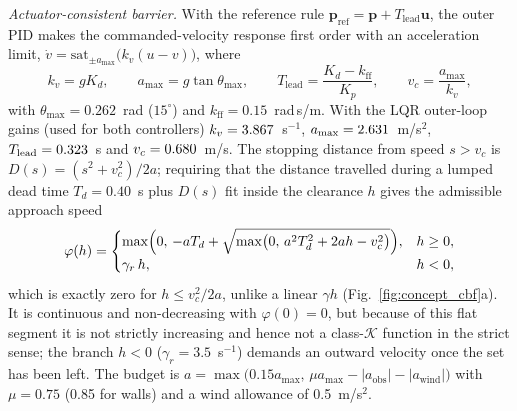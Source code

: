 \documentclass[10pt,letterpaper]{article}
\begin{document}
\emph{Actuator-consistent barrier.} With the reference rule $\mathbf{p}_{\mathrm{ref}}=\mathbf{p}+T_{\mathrm{lead}}\mathbf{u}$, the
outer PID makes the commanded-velocity response first order with an acceleration limit,
$\dot v=\mathrm{sat}_{\pm a_{\max}}\bigl(k_v(u-v)\bigr)$, where
\begin{equation}
    k_v=gK_d,\qquad a_{\max}=g\tan\theta_{\max},\qquad
    T_{\mathrm{lead}}=\frac{K_d-k_{\mathrm{ff}}}{K_p},\qquad v_c=\frac{a_{\max}}{k_v},
    \label{eq:plant}
\end{equation}
with $\theta_{\max}=0.262$~rad ($15^\circ$) and $k_{\mathrm{ff}}=0.15$~rad\,s/m. With the LQR outer-loop gains
(used for both controllers) $k_v=3.867$~s$^{-1}$, $a_{\max}=2.631$~m/s$^2$,
$T_{\mathrm{lead}}=0.323$~s and $v_c=0.680$~m/s. The stopping distance from speed
$s>v_c$ is $D(s)=(s^2+v_c^2)/2a$; requiring that the distance travelled during a lumped dead time
$T_d=0.40$~s plus $D(s)$ fit inside the clearance $h$ gives the admissible approach speed
\begin{equation}
    \varphi(h)=
    \begin{cases}
        \max\Bigl(0,\,-aT_d+\sqrt{\max\bigl(0,\,a^2T_d^2+2ah-v_c^2\bigr)}\Bigr), & h\ge 0,\\
        \gamma_r\,h, & h<0,
    \end{cases}
    \label{eq:phi}
\end{equation}
which is exactly zero for $h\le v_c^2/2a$, unlike a linear $\gamma h$
(Fig.~\ref{fig:concept_cbf}a). It is continuous and non-decreasing with $\varphi(0)=0$, but because
of this flat segment it is not strictly increasing and hence not a class-$\mathcal{K}$ function in the
strict sense; the branch $h<0$ ($\gamma_r=3.5$~s$^{-1}$) demands an outward
velocity once the set has been left. The budget is
$a=\max\bigl(0.15a_{\max},\,\mu a_{\max}-|a_{\mathrm{obs}}|-|a_{\mathrm{wind}}|\bigr)$ with
$\mu=0.75$ (0.85 for walls) and a wind allowance of 0.5~m/s$^2$.
\end{document}
